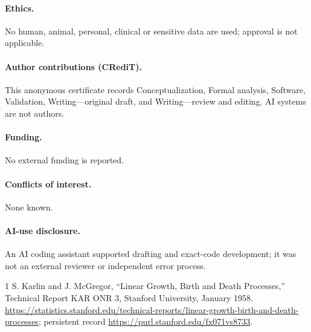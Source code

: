 \documentclass[9pt]{extarticle}
\begin{document}
\paragraph{Ethics.} No human, animal, personal, clinical or sensitive data
are used; approval is not applicable.
\paragraph{Author contributions (CRediT).} This anonymous certificate records
Conceptualization, Formal analysis, Software, Validation, Writing---original
draft, and Writing---review and editing.  AI systems are not authors.
\paragraph{Funding.} No external funding is reported.
\paragraph{Conflicts of interest.} None known.
\paragraph{AI-use disclosure.} An AI coding assistant supported drafting and
exact-code development; it was not an external reviewer or independent error
process.

\begin{thebibliography}{1}
S. Karlin and J. McGregor,
``Linear Growth, Birth and Death Processes,'' Technical Report KAR ONR 3,
Stanford University, January 1958.
\url{https://statistics.stanford.edu/technical-reports/linear-growth-birth-and-death-processes};
persistent record \url{https://purl.stanford.edu/fx071vs8733}.
\end{thebibliography}
\end{document}
